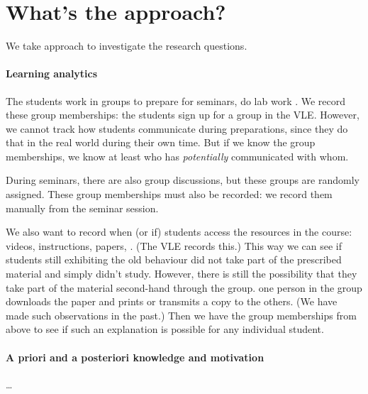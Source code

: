 \section{What's the approach?}

We take  approach to investigate the research questions.

\paragraph{Learning analytics}

The students work in groups to prepare for seminars, do lab work \etc.
We record these group memberships: the students sign up for a group in the 
\ac{VLE}.
However, we cannot track how students communicate during preparations, since 
they do that in the real world during their own time.
But if we know the group memberships, we know at least who has 
\emph{potentially} communicated with whom.

During seminars, there are also group discussions, but these groups are 
randomly assigned.
These group memberships must also be recorded: we record them manually from the 
seminar session.

We also want to record when (or if) students access the resources in the 
course:
videos,
instructions,
papers,
\etc.
(The \ac{VLE} records this.)
This way we can see if students still exhibiting the old behaviour did not take 
part of the prescribed material and simply didn't study.
However, there is still the possibility that they take part of the material 
second-hand through the group.
\Eg one person in the group downloads the paper and prints or transmits a copy 
to the others.
(We have made such observations in the past.)
Then we have the group memberships from above to see if such an explanation is 
possible for any individual student.

\paragraph{A priori and a posteriori knowledge and motivation}

\dots

